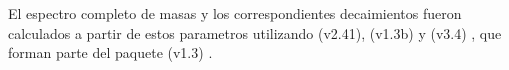 
El espectro completo de masas y los correspondientes decaimientos fueron calculados a partir
de estos parametros utilizando {\suspect} (v2.41)\cite{Djouadi2007426}, {\sdecay} (v1.3b) \cite{Muhlleitner:2004mka}
y {\hdecay} (v3.4) \cite{Djouadi:1997yw}, que forman parte del paquete {\susyhit} (v1.3) \cite{Djouadi:2006bz}.

